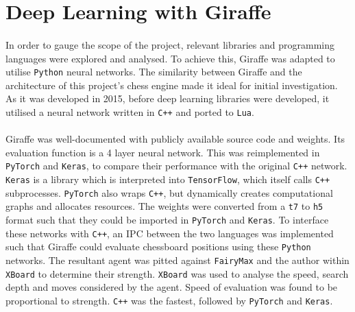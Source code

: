 \documentclass[12pt,a4paper]{book}
\begin{document}
\section{Deep Learning with Giraffe}

\paragraph{} In order to gauge the scope of the project, relevant libraries and programming languages were explored and analysed. To achieve this, Giraffe was adapted to utilise \texttt{Python} neural networks. The similarity between Giraffe and the architecture of this project's chess engine made it ideal for initial investigation. As it was developed in 2015, before deep learning libraries were developed, it utilised a neural network written in \texttt{C++} and ported to \texttt{Lua}. 

\paragraph{} Giraffe was well-documented with publicly available source code and weights. Its evaluation function is a 4 layer neural network. \cite{giraffe} This was reimplemented in \texttt{PyTorch} and \texttt{Keras}, to compare their performance with the original \texttt{C++} network. \texttt{Keras} is a library which is interpreted into \texttt{TensorFlow}, which itself calls \texttt{C++} subprocesses. \cite{tensorflow} \texttt{PyTorch} also wraps \texttt{C++}, but dynamically creates computational graphs and allocates resources. \cite{PyTorch} The weights were converted from a \texttt{t7} to \texttt{h5} format such that they could be imported in \texttt{PyTorch} and \texttt{Keras}. To interface these networks with \texttt{C++}, an IPC between the two languages was implemented such that Giraffe could evaluate chessboard positions using these \texttt{Python} networks. The resultant agent was pitted against \texttt{FairyMax} and the author within \texttt{XBoard} to determine their strength. \texttt{XBoard} was used to analyse the speed, search depth and moves considered by the agent. Speed of evaluation was found to be proportional to strength. \texttt{C++} was the fastest, followed by \texttt{PyTorch} and \texttt{Keras}. 
\end{document}
